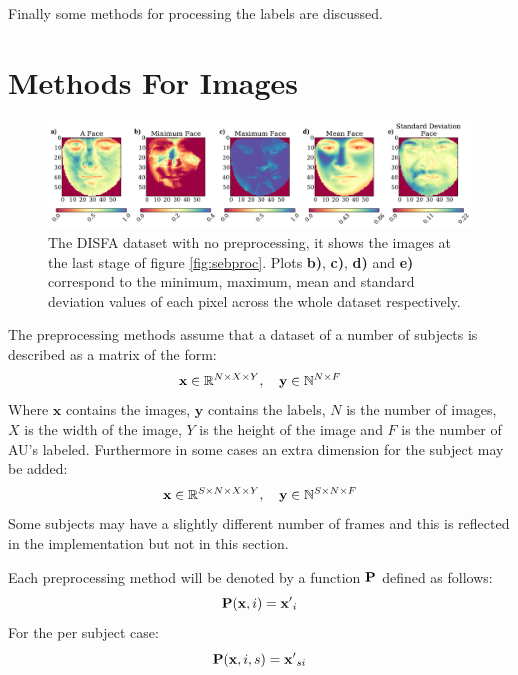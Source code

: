 Finally some methods for processing the labels are discussed.

\section{Methods For Images} \label{sec:methods}

\begin{figure}[!h] \centering
\includegraphics[width =\hsize]{figures/faces.pdf}
\caption{The DISFA dataset with no preprocessing, it shows
the images at the last stage of figure \ref{fig:sebproc}. Plots {\bf b)}, {\bf c)}, {\bf d)}
and {\bf e)}
correspond to the minimum, maximum, mean and standard deviation values of each pixel across
the whole dataset respectively.} \label{fig:faces_none} \end{figure}

The preprocessing methods assume that a dataset of a number of subjects
is described as a matrix of the form:
\begin{equation}
{\bf x} \in \mathbb{R}^{N\times X \times Y},\quad {\bf y} \in \mathbb{N}^{N\times F}
\end{equation}
Where $\mathbf{x}$ contains the images, $\mathbf{y}$ contains the labels,
$N$ is the number of images, $X$ is the width of the image, $Y$ is the height of the
image and $F$ is the number of AU's labeled. Furthermore in some cases an extra dimension
for the subject may be added:
\begin{equation}
{\bf x} \in \mathbb{R}^{S\times N\times X \times Y},\quad {\bf y} \in \mathbb{N}^{S\times N\times F}
\end{equation}
Some subjects may have a slightly different number of frames and this is reflected
in the implementation but not in this section.

Each preprocessing method will be denoted by a function ${\bf P}$ defined as follows:
\begin{equation}
  {\bf P}({\bf x},i) = {\bf x'}_i
\end{equation}
For the per subject case:
\begin{equation}
  {\bf P}({\bf x},i,s) = {\bf x'}_{si}
\end{equation}

